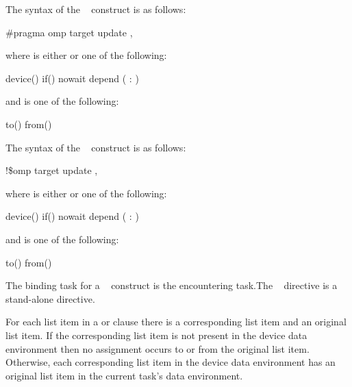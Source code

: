 \syntax
\ccppspecificstart
The syntax of the ~ construct is as follows:

\begin{boxedcode}
\#pragma omp target update \plc{clause[ [},\plc{] clause] ... ] new-line}
\end{boxedcode}
where  is either  or one of the following:

\begin{indentedcodelist}
device()
if()
nowait
depend ( : )
\end{indentedcodelist}

and  is one of the following:

\begin{indentedcodelist}
to()
from()
\end{indentedcodelist}
\ccppspecificend

\fortranspecificstart
The syntax of the ~ construct is as follows:

\begin{boxedcode}
!\$omp target update \plc{clause[ [},\plc{] clause] ... ]}
\end{boxedcode}

where  is either  or one of the following:

\begin{indentedcodelist}
device()
if()
nowait
depend ( : )
\end{indentedcodelist}

and  is one of the following:

\begin{indentedcodelist}
to()
from()
\end{indentedcodelist}
\fortranspecificend

\binding
The binding task for a ~ construct is the encountering task.The 
~ directive is a stand-alone directive.

\descr
For each list item in a  or  clause there is a corresponding list item and an 
original list item. If the corresponding list item is not present in the device data environment then no assignment occurs to or from the original list item. Otherwise, each corresponding list item in the 
device data environment has an original list item in the current task's data environment.


